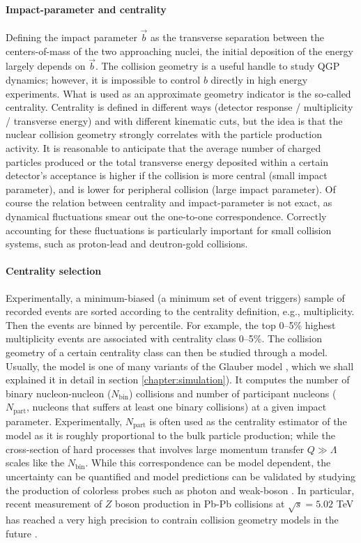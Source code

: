 \paragraph{Impact-parameter and centrality} Defining the impact parameter $\vec{b}$ as the transverse separation between the centers-of-mass of the two approaching nuclei, the initial deposition of the energy largely depends on $\vec{b}$.
The collision geometry is a useful handle to study QGP dynamics; however,
it is impossible to control $b$ directly in high energy experiments.
What is used as an approximate geometry indicator is the so-called centrality.
Centrality is defined in different ways (detector response / multiplicity / transverse energy) and with different kinematic cuts, but the idea is that the nuclear collision geometry strongly correlates with the particle production activity.
It is reasonable to anticipate that the average number of charged particles produced or the total transverse energy deposited within a certain detector's acceptance is higher if the collision is more central (small impact parameter), and is lower for peripheral collision (large impact parameter).
Of course the relation between centrality and impact-parameter is not exact, as dynamical fluctuations smear out the one-to-one correspondence.
Correctly accounting for these fluctuations is particularly important for small collision systems, such as proton-lead and deutron-gold collisions.

\paragraph{Centrality selection} Experimentally, a minimum-biased (a minimum set of event triggers) sample of recorded events are sorted according to the centrality definition, e.g., multiplicity. 
Then the events are binned by percentile.
For example, the top 0--5\% highest multiplicity events are associated with centrality class 0--5\%. 
The collision geometry of a certain centrality class can then be studied through a model.
Usually, the model is one of many variants of the Glauber model \cite{Miller:2007ri}, which we shall explained it in detail in section \ref{chapter:simulation}).
It computes the number of binary nucleon-nucleon ($N_{\textrm{bin}}$) collisions and number of participant nucleons ($N_{\textrm{part}}$, nucleons that suffers at least one binary collisions) at a given impact parameter.
Experimentally, $N_{\textrm{part}}$ is often used as the centrality estimator of the model as it is roughly proportional to the bulk particle production; while the cross-section of hard processes that involves large momentum transfer $Q \gg \Lambda$ scales like the $N_{\textrm{bin}}$.
While this correspondence can be model dependent, the uncertainty can be quantified and model predictions can be validated by studying the production of colorless probes such as photon and weak-boson \cite{Afanasiev:2012dg,Chatrchyan:2011ua,Aad:2012ew,Aad:2015lcb,Adam:2015lda}.
In particular, recent measurement of $Z$ boson production in Pb-Pb collisions at $\sqrt{s}=5.02$ TeV has reached a very high precision to contrain collision geometry models in the future \cite{ATLAS:2017zkv}.

